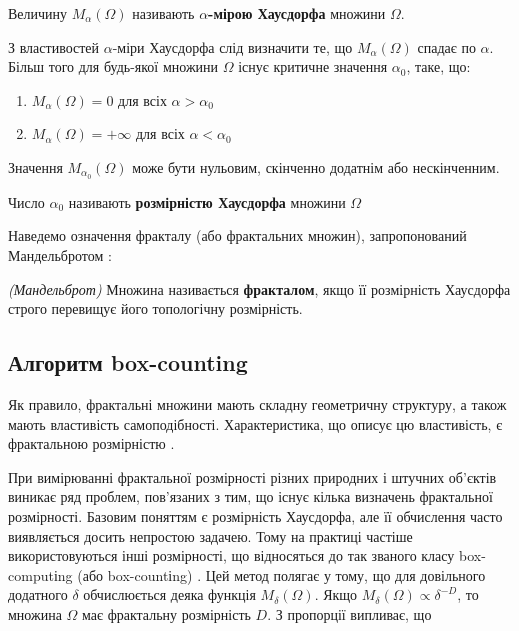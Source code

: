 \begin{defn}
	Величину $M_{\alpha}(\Omega)$ називають \textbf{$\alpha$-мірою Хаусдорфа} множини $\Omega$.
\end{defn}

З властивостей $\alpha$-міри Хаусдорфа слід визначити те, що $M_{\alpha}(\Omega)$ спадає по $\alpha$. Більш того для будь-якої множини $\Omega$ існує критичне значення $\alpha_0$, таке, що:
\begin{enumerate}
	\item $M_{\alpha}(\Omega)=0$ для всіх $\alpha>\alpha_0$
	\item $M_{\alpha}(\Omega)=+\infty$ для всіх $\alpha<\alpha_0$
\end{enumerate}

Значення $M_{\alpha_0}(\Omega)$ може бути нульовим, скінченно додатнім або нескінченним.

\begin{defn}
	Число $\alpha_0$ називають \textbf{розмірністю Хаусдорфа} множини $\Omega$
\end{defn}

Наведемо означення фракталу (або фрактальних множин), запропонований Мандельбротом \citep{book:mandelbrot}: 

\begin{defn}
	\emph{(Мандельброт)}
	Множина називається \textbf{фракталом}, якщо її розмірність Хаусдорфа строго перевищує його топологічну розмірність.
\end{defn} 


\subsection{Алгоритм box-counting}

Як правило, фрактальні множини мають складну геометричну структуру, а також мають властивість самоподібності. Характеристика, що описує цю властивість, є фрактальною розмірністю \citep{book:voss}.

При вимірюванні фрактальної розмірності різних природних і штучних
об'єктів виникає ряд проблем, пов'язаних з тим, що існує кілька визначень фрактальної розмірності. Базовим поняттям є розмірність Хаусдорфа, але її обчислення часто виявляється досить непростою задачею. Тому на практиці частіше використовуються інші розмірності, що відносяться до так званого класу box-computіng (або box-countіng) \citep{bib:boxcount}. Цей метод полягає у тому, що для довільного додатного $\delta$ обчислюється деяка функція $M_{\delta}(\Omega)$. Якщо $M_{\delta}(\Omega) \propto \delta^{-D}$, то множина $\Omega$ має фрактальну розмірність $D$. З пропорції випливає, що

